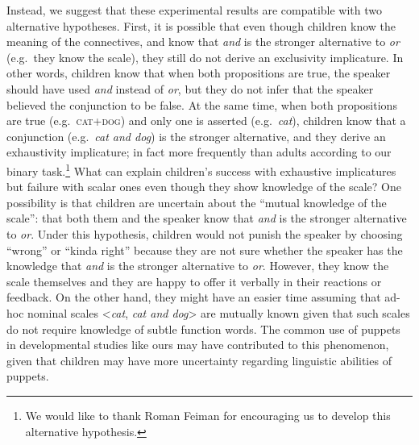 \documentclass[
  english,
  ,man,floatsintext]{apa6}
\begin{document}
Instead, we suggest that these experimental results are compatible with two alternative hypotheses. First, it is possible that even though children know the meaning of the connectives, and know that \emph{and} is the stronger alternative to \emph{or} (e.g.~they know the scale), they still do not derive an exclusivity implicature. In other words, children know that when both propositions are true, the speaker should have used \emph{and} instead of \emph{or}, but they do not infer that the speaker believed the conjunction to be false. At the same time, when both propositions are true (e.g.~\textsc{cat+dog}) and only one is asserted (e.g.~\emph{cat}), children know that a conjunction (e.g.~\emph{cat and dog}) is the stronger alternative, and they derive an exhaustivity implicature; in fact more frequently than adults according to our binary task.\footnote{We would like to thank Roman Feiman for encouraging us to develop this alternative hypothesis.} What can explain children's success with exhaustive implicatures but failure with scalar ones even though they show knowledge of the scale? One possibility is that children are uncertain about the \enquote{mutual knowledge of the scale}: that both them and the speaker know that \emph{and} is the stronger alternative to \emph{or}. Under this hypothesis, children would not punish the speaker by choosing \enquote{wrong} or \enquote{kinda right} because they are not sure whether the speaker has the knowledge that \emph{and} is the stronger alternative to \emph{or}. However, they know the scale themselves and they are happy to offer it verbally in their reactions or feedback. On the other hand, they might have an easier time assuming that ad-hoc nominal scales \textless{}\emph{cat}, \emph{cat and dog}\textgreater{} are mutually known given that such scales do not require knowledge of subtle function words. The common use of puppets in developmental studies like ours may have contributed to this phenomenon, given that children may have more uncertainty regarding linguistic abilities of puppets.
\end{document}
